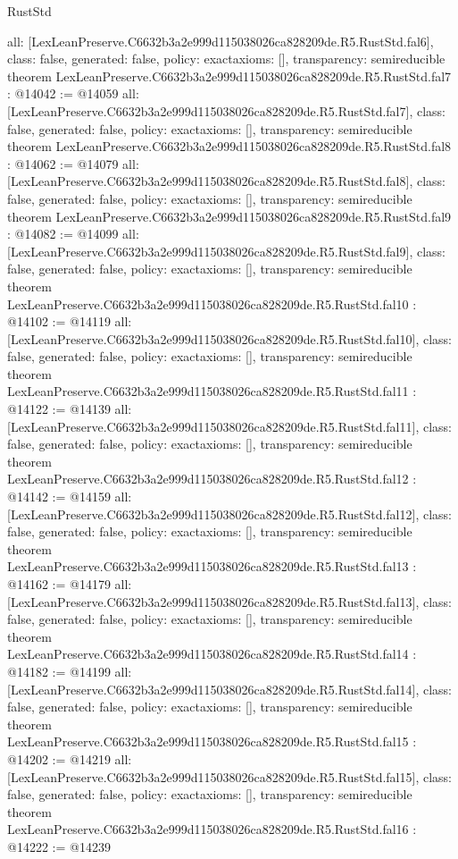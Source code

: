 \begin{lexlean}{RustStd}
\begin{coremodule}
{  all: [LexLeanPreserve.C6632b3a2e999d115038026ca828209de.R5.RustStd.fal6],
  class: false,
  generated: false,
  policy: exact{axioms: []},
  transparency: semireducible
}
theorem LexLeanPreserve.C6632b3a2e999d115038026ca828209de.R5.RustStd.fal7 : @14042 := @14059 {
  all: [LexLeanPreserve.C6632b3a2e999d115038026ca828209de.R5.RustStd.fal7],
  class: false,
  generated: false,
  policy: exact{axioms: []},
  transparency: semireducible
}
theorem LexLeanPreserve.C6632b3a2e999d115038026ca828209de.R5.RustStd.fal8 : @14062 := @14079 {
  all: [LexLeanPreserve.C6632b3a2e999d115038026ca828209de.R5.RustStd.fal8],
  class: false,
  generated: false,
  policy: exact{axioms: []},
  transparency: semireducible
}
theorem LexLeanPreserve.C6632b3a2e999d115038026ca828209de.R5.RustStd.fal9 : @14082 := @14099 {
  all: [LexLeanPreserve.C6632b3a2e999d115038026ca828209de.R5.RustStd.fal9],
  class: false,
  generated: false,
  policy: exact{axioms: []},
  transparency: semireducible
}
theorem LexLeanPreserve.C6632b3a2e999d115038026ca828209de.R5.RustStd.fal10 : @14102 := @14119 {
  all: [LexLeanPreserve.C6632b3a2e999d115038026ca828209de.R5.RustStd.fal10],
  class: false,
  generated: false,
  policy: exact{axioms: []},
  transparency: semireducible
}
theorem LexLeanPreserve.C6632b3a2e999d115038026ca828209de.R5.RustStd.fal11 : @14122 := @14139 {
  all: [LexLeanPreserve.C6632b3a2e999d115038026ca828209de.R5.RustStd.fal11],
  class: false,
  generated: false,
  policy: exact{axioms: []},
  transparency: semireducible
}
theorem LexLeanPreserve.C6632b3a2e999d115038026ca828209de.R5.RustStd.fal12 : @14142 := @14159 {
  all: [LexLeanPreserve.C6632b3a2e999d115038026ca828209de.R5.RustStd.fal12],
  class: false,
  generated: false,
  policy: exact{axioms: []},
  transparency: semireducible
}
theorem LexLeanPreserve.C6632b3a2e999d115038026ca828209de.R5.RustStd.fal13 : @14162 := @14179 {
  all: [LexLeanPreserve.C6632b3a2e999d115038026ca828209de.R5.RustStd.fal13],
  class: false,
  generated: false,
  policy: exact{axioms: []},
  transparency: semireducible
}
theorem LexLeanPreserve.C6632b3a2e999d115038026ca828209de.R5.RustStd.fal14 : @14182 := @14199 {
  all: [LexLeanPreserve.C6632b3a2e999d115038026ca828209de.R5.RustStd.fal14],
  class: false,
  generated: false,
  policy: exact{axioms: []},
  transparency: semireducible
}
theorem LexLeanPreserve.C6632b3a2e999d115038026ca828209de.R5.RustStd.fal15 : @14202 := @14219 {
  all: [LexLeanPreserve.C6632b3a2e999d115038026ca828209de.R5.RustStd.fal15],
  class: false,
  generated: false,
  policy: exact{axioms: []},
  transparency: semireducible
}
theorem LexLeanPreserve.C6632b3a2e999d115038026ca828209de.R5.RustStd.fal16 : @14222 := @14239 {
}
\end{coremodule}
\end{lexlean}
